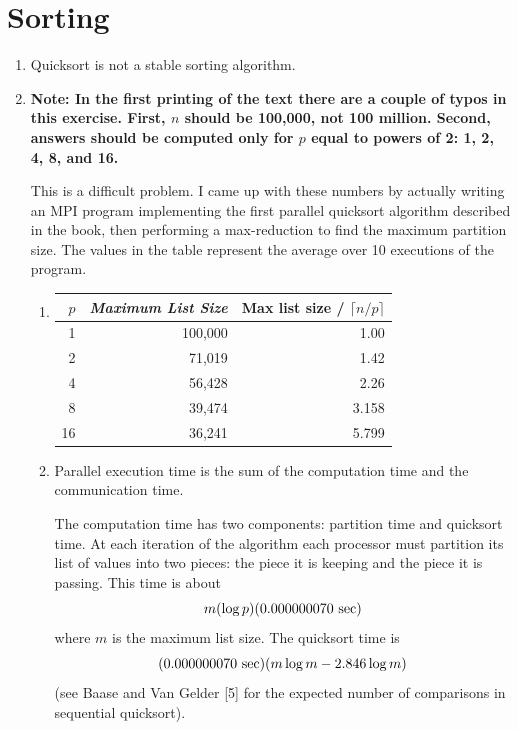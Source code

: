 \chapter{Sorting}

\begin{enumerate}
\item
Quicksort is not a stable sorting algorithm.

\item {\bf Note: In the first printing of the text there are a couple of typos
      in this exercise. First, $n$ should be 100,000, not 100 million.
      Second, answers should be computed only for $p$ equal to powers of 2:
      1, 2, 4, 8, and 16.}

      This is a difficult problem. I came up with these numbers by actually
      writing an MPI program implementing the first parallel quicksort
      algorithm described in the book, then performing a max-reduction to
      find the maximum partition size. The values in the table represent the
      average over 10 executions of the program.

\begin{enumerate}
\item

\begin{tabular}{|r|r|r|}
\hline
$p$ & {\it Maximum List Size} & Max list size / $\lceil n/p\rceil$ \\
\hline
1  & 100,000 & 1.00 \\
2  &  71,019 & 1.42 \\
4  &  56,428 & 2.26 \\
8  &  39,474 & 3.158 \\
16 &  36,241 & 5.799 \\
\hline
\end{tabular}

\item Parallel execution time is the sum of the computation time and the
      communication time.

      The computation time has two components: partition
      time and quicksort time. At each iteration of the algorithm each
      processor must partition its list of values into two pieces: the piece it
      is keeping and the piece it is passing. This time is about
      $$m(\log p)(0.000000070 {\rm\ sec})$$
      where $m$ is the maximum list size.
      The quicksort time is
      $$(0.000000070 {\rm\ sec})(m \log m - 2.846\log m)$$
      (see Baase and Van Gelder [5] for the expected number of comparisons
      in sequential quicksort).


\end{enumerate}
\end{enumerate}
